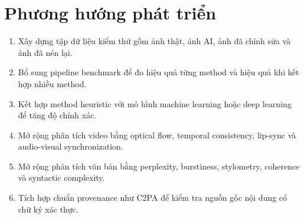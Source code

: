 \section{Phương hướng phát triển}
\begin{enumerate}
  \item Xây dựng tập dữ liệu kiểm thử gồm ảnh thật, ảnh AI, ảnh đã chỉnh sửa và ảnh đã nén lại.
  \item Bổ sung pipeline benchmark để đo hiệu quả từng method và hiệu quả khi kết hợp nhiều method.
  \item Kết hợp method heuristic với mô hình machine learning hoặc deep learning để tăng độ chính xác.
  \item Mở rộng phân tích video bằng optical flow, temporal consistency, lip-sync và audio-visual synchronization.
  \item Mở rộng phân tích văn bản bằng perplexity, burstiness, stylometry, coherence và syntactic complexity.
  \item Tích hợp chuẩn provenance như C2PA để kiểm tra nguồn gốc nội dung có chữ ký xác thực.
\end{enumerate}
